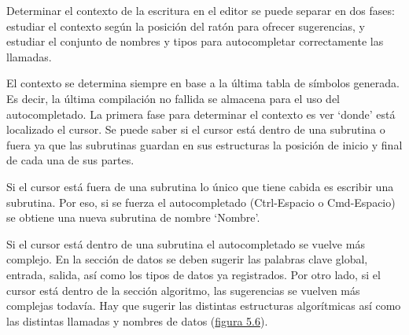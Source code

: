 \documentclass{report}
\begin{document}
	Determinar el contexto de la escritura en el editor se puede separar en dos fases: estudiar el contexto según la posición del ratón para ofrecer sugerencias, y estudiar el conjunto de nombres y tipos para autocompletar correctamente las llamadas.
	
	\vspace{10px}
	
	El contexto se determina siempre en base a la última tabla de símbolos generada. Es decir, la última compilación no fallida se almacena para el uso del autocompletado. La primera fase para determinar el contexto es ver `donde' está localizado el cursor. Se puede saber si el cursor está dentro de una subrutina o fuera ya que las subrutinas guardan en sus estructuras la posición de inicio y final de cada una de sus partes. 
	
	\vspace{10px}
	
	Si el cursor está fuera de una subrutina lo único que tiene cabida es escribir una subrutina. Por eso, si se fuerza el autocompletado (Ctrl-Espacio o Cmd-Espacio) se obtiene una nueva subrutina de nombre `Nombre'.
	
	\vspace{10px}
	
	Si el cursor está dentro de una subrutina el autocompletado se vuelve más complejo. En la sección de datos se deben sugerir las palabras clave global, entrada, salida, así como los tipos de datos ya registrados. Por otro lado, si el cursor está dentro de la sección algoritmo, las sugerencias se vuelven más complejas todavía. Hay que sugerir las distintas estructuras algorítmicas así como las distintas llamadas y nombres de datos (\hyperref[fig:autocompletado]{figura 5.6}).
	
\end{document}
